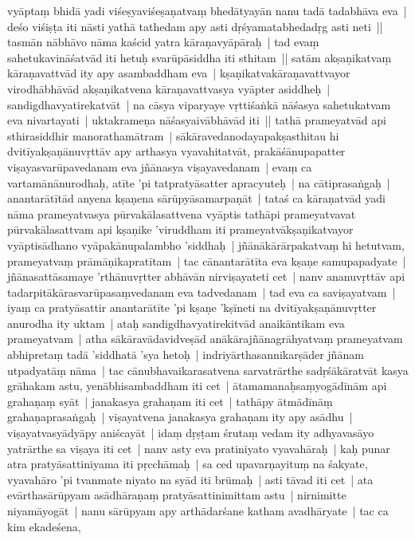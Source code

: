 \documentclass[article,12pt,a4paper]{memoir}%
\newcounter{parCount}
\begin{document}
	  \pstart \leavevmode%
	vyāptaṃ bhidā yadi viśeṣyaviśeṣaṇatvaṃ bhedātyayān nanu tadā tadabhāva eva | deśo viśiṣṭa iti nāsti yathā tathedam apy asti dṛśyamatabhedadṛg asti neti ||  \label{thakur75-124.8} tasmān nābhāvo nāma kaścid yatra kāraṇavyāpāraḥ | tad evaṃ sahetukavināśatvād iti hetuḥ svarūpāsiddha iti sthitam || \label{thakur75-124.10} satām akṣaṇikatvaṃ kāraṇavattvād ity apy asambaddham eva | kṣaṇikatvakāraṇavattvayor virodhābhāvād akṣaṇikatvena kāraṇavattvasya vyāpter asiddheḥ | sandigdhavyatirekatvāt | na cāsya viparyaye vṛttiśaṅkā nāśasya sahetukatvam eva nivartayati | uktakrameṇa nāśasyaivābhāvād iti || \label{thakur75-124.14} tathā prameyatvād api sthirasiddhir manorathamātram | sākāravedanodayapakṣasthitau hi dvitīyakṣaṇānuvṛttāv apy arthasya vyavahitatvāt, prakāśānupapatter viṣayasvarūpavedanam eva jñānasya viṣayavedanam | evaṃ ca vartamānānurodhaḥ, atīte 'pi tatpratyāsatter apracyuteḥ | na cātiprasaṅgaḥ | anantarātītād anyena kṣaṇena sārūpyāsamarpaṇāt | tataś ca kāraṇatvād yadi nāma prameyatvasya pūrvakālasattvena vyāptis tathāpi prameyatvavat pūrvakālasattvam api kṣaṇike 'viruddham iti prameyatvākṣaṇikatvayor vyāptisādhano vyāpakānupalambho 'siddhaḥ | jñānākārārpakatvaṃ hi hetutvam, prameyatvaṃ prāmāṇikapratītam | tac cānantarātīta eva kṣaṇe samupapadyate | \label{thakur75-124.22} jñānasattāsamaye 'rthānuvṛtter abhāvān nirviṣayateti cet | \label{thakur75-124.22a} nanv ananuvṛttāv api tadarpitākārasvarūpasaṃvedanam eva tadvedanam | tad eva ca saviṣayatvam | iyaṃ ca pratyāsattir anantarātīte 'pi kṣaṇe 'kṣīneti na dvitīyakṣaṇānuvṛtter anurodha ity uktam | ataḥ sandigdhavyatirekitvād anaikāntikam eva prameyatvam | \label{thakur75-124.26} atha sākāravādavidveṣād anākārajñānagrāhyatvaṃ prameyatvam abhipretaṃ tadā 'siddhatā 'sya hetoḥ | \label{thakur75-124.27} indriyārthasannikarṣāder jñānam utpadyatāṃ nāma | \label{thakur75-124.27a} tac cānubhavaikarasatvena sarvatrārthe sadṛśākāratvāt kasya grāhakam astu, \label{thakur75-124.28} yenābhisambaddham iti cet | \label{thakur75-124.28a} ātamamanaḥsaṃyogādīnām api grahaṇaṃ syāt | \label{thakur75-124.29} janakasya grahaṇam iti cet | \label{thakur75-124.29a} tathāpy ātmādīnāṃ grahaṇaprasaṅgaḥ | viṣayatvena janakasya grahaṇam ity apy asādhu | viṣayatvasyādyāpy aniścayāt | \label{thakur75-124.30} idaṃ dṛṣṭam śrutaṃ vedam ity adhyavasāyo yatrārthe sa viṣaya iti cet | \label{thakur75-124.31} nanv asty eva pratiniyato vyavahāraḥ | kaḥ punar atra pratyāsattiniyama iti pṛcchāmaḥ | sa ced upavarṇayituṃ na śakyate, vyavahāro 'pi tvanmate niyato na syād iti brūmaḥ | \label{thakur75-124.33} asti tāvad iti cet | \label{thakur75-124.34} ata evārthasārūpyam asādhāraṇaṃ pratyāsattinimittam astu | nirnimitte niyamāyogāt | \label{thakur75-125.1} nanu sārūpyam apy arthādarśane katham avadhāryate | tac ca kim ekadeśena, 
\end{document}
